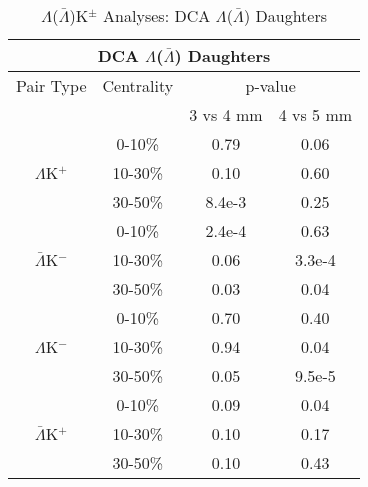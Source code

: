 \documentclass[../AnalysisNoteJBuxton.tex]{subfiles}
\begin{document}
\begin{table}
 \centering
 \begin{tabular}{|c|c|c|c|}
 \multicolumn{4}{c}{DCA $\Lambda$($\bar{\Lambda}$) Daughters} \\
  \hline
  Pair Type & Centrality & \multicolumn{2}{c|}{p-value} \\
  \cline{3-4}
   & & 3 vs 4 mm & 4 vs 5 mm \\
  \hline
   & 0-10\% & 0.79 & 0.06 \\
  $\Lambda$K$^{+}$ 
   & 10-30\% & 0.10 & 0.60 \\
   & 30-50\% & 8.4e-3 & 0.25 \\
  \hline
   & 0-10\% & 2.4e-4 & 0.63 \\
  $\bar{\Lambda}$K$^{-}$ 
   & 10-30\% & 0.06 & 3.3e-4 \\
   & 30-50\% & 0.03 & 0.04 \\
  \hline \hline
   & 0-10\% & 0.70 & 0.40 \\
  $\Lambda$K$^{-}$ 
   & 10-30\% & 0.94 & 0.04 \\
   & 30-50\% & 0.05 & 9.5e-5 \\
  \hline
   & 0-10\% & 0.09 & 0.04 \\
  $\bar{\Lambda}$K$^{+}$ 
   & 10-30\% & 0.10 & 0.17 \\
   & 30-50\% & 0.10 & 0.43 \\
  \hline
 \end{tabular}
 \caption{$\Lambda$($\bar{\Lambda}$)K$^{\pm}$ Analyses: DCA $\Lambda$($\bar{\Lambda}$) Daughters}
 \label{tab:LamDaughtersDcaLamKch}
\end{table}
\end{document}
